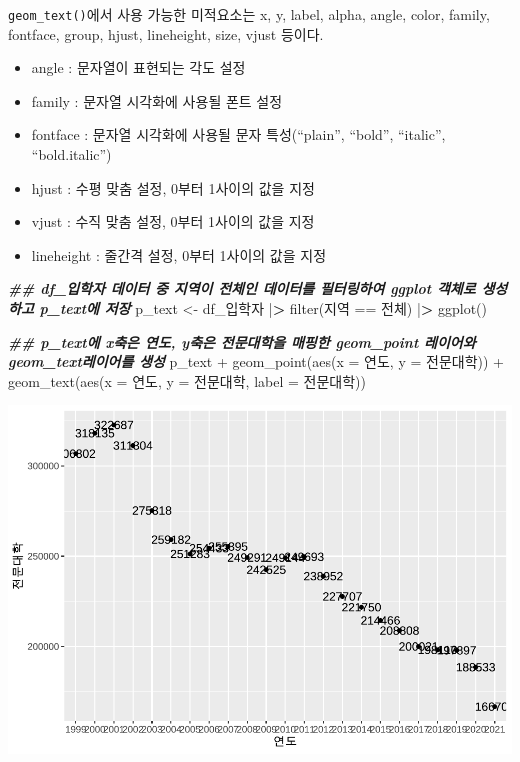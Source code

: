 \documentclass[
]{article}
\newenvironment{Shaded}{\begin{snugshade}}{\end{snugshade}}
\newcommand{\AttributeTok}[1]{\textcolor[rgb]{0.77,0.63,0.00}{#1}}
\newcommand{\DocumentationTok}[1]{\textcolor[rgb]{0.56,0.35,0.01}{\textbf{\textit{#1}}}}
\newcommand{\ErrorTok}[1]{\textcolor[rgb]{0.64,0.00,0.00}{\textbf{#1}}}
\newcommand{\FunctionTok}[1]{\textcolor[rgb]{0.00,0.00,0.00}{#1}}
\newcommand{\NormalTok}[1]{#1}
\newcommand{\OtherTok}[1]{\textcolor[rgb]{0.56,0.35,0.01}{#1}}
\newcommand{\SpecialCharTok}[1]{\textcolor[rgb]{0.00,0.00,0.00}{#1}}
\newcommand{\StringTok}[1]{\textcolor[rgb]{0.31,0.60,0.02}{#1}}
\begin{document}
\texttt{geom\_text()}에서 사용 가능한 미적요소는 x, y, label, alpha, angle, color, family, fontface, group, hjust, lineheight, size, vjust 등이다.

\begin{itemize}
\item
  angle : 문자열이 표현되는 각도 설정
\item
  family : 문자열 시각화에 사용될 폰트 설정
\item
  fontface : 문자열 시각화에 사용될 문자 특성(``plain'', ``bold'', ``italic'', ``bold.italic'')
\item
  hjust : 수평 맞춤 설정, 0부터 1사이의 값을 지정
\item
  vjust : 수직 맞춤 설정, 0부터 1사이의 값을 지정
\item
  lineheight : 줄간격 설정, 0부터 1사이의 값을 지정
\end{itemize}

\begin{Shaded}
\begin{Highlighting}[]
\DocumentationTok{\#\#  df\_입학자 데이터 중 지역이 전체인 데이터를 필터링하여 ggplot 객체로 생성하고 p\_text에 저장}
\NormalTok{p\_text }\OtherTok{\textless{}{-}}\NormalTok{ df\_입학자 }\SpecialCharTok{|}\ErrorTok{\textgreater{}} \FunctionTok{filter}\NormalTok{(지역 }\SpecialCharTok{==} \StringTok{\textquotesingle{}전체\textquotesingle{}}\NormalTok{) }\SpecialCharTok{|}\ErrorTok{\textgreater{}}
  \FunctionTok{ggplot}\NormalTok{()}

\DocumentationTok{\#\#  p\_text에 x축은 연도, y축은 전문대학을 매핑한 geom\_point 레이어와 geom\_text레이어를 생성}
\NormalTok{p\_text }\SpecialCharTok{+}
  \FunctionTok{geom\_point}\NormalTok{(}\FunctionTok{aes}\NormalTok{(}\AttributeTok{x =}\NormalTok{ 연도, }\AttributeTok{y =}\NormalTok{ 전문대학)) }\SpecialCharTok{+}
  \FunctionTok{geom\_text}\NormalTok{(}\FunctionTok{aes}\NormalTok{(}\AttributeTok{x =}\NormalTok{ 연도, }\AttributeTok{y =}\NormalTok{ 전문대학, }\AttributeTok{label =}\NormalTok{ 전문대학))}
\end{Highlighting}
\end{Shaded}

\includegraphics{chap3_files/figure-latex/unnamed-chunk-30-1.pdf}
\end{document}
